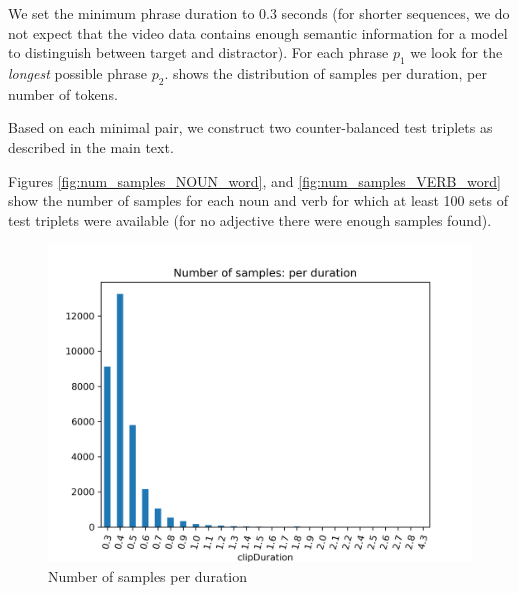 We set the minimum phrase duration to 0.3 seconds (for shorter sequences, we do not expect that the video data contains enough semantic information for a model to distinguish between target and distractor). For each phrase $p_1$ we look for the \textit{longest} possible phrase $p_2$.  shows the distribution of samples per duration,  per number of tokens.

Based on each minimal pair, we construct two counter-balanced test triplets as described in the main text.

Figures \ref{fig:num_samples_NOUN_word}, and \ref{fig:num_samples_VERB_word} show the number of samples for each noun and verb for which at least 100 sets of test triplets were available (for no adjective there were enough samples found).


\begin{figure}
  \centering
  \includegraphics[width=\textwidth]{results/targeted_triplets/num_samples_vs_duration.png}
  \caption{Number of samples per duration}
  \label{fig:num_samples_vs_duration}
\end{figure}


